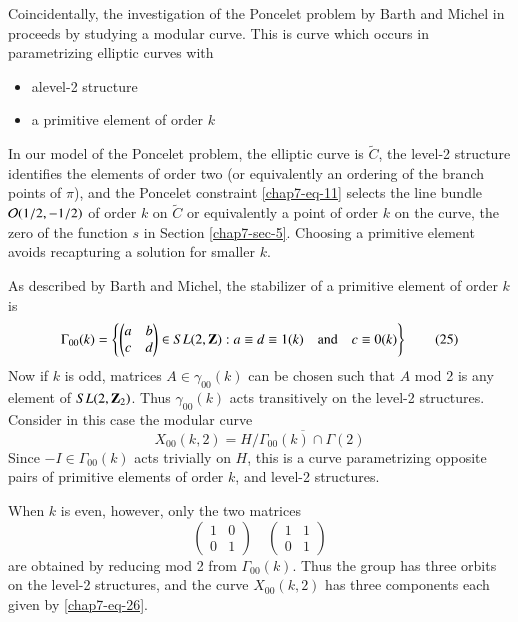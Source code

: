 Coincidentally, the investigation of the Poncelet problem by Barth and Michel in \cite{chap7-key1} proceeds by studying a modular curve. This is curve which occurs in parametrizing elliptic curves with     
\begin{itemize}
\item a\pageoriginale level-2 structure

\item a primitive element of order $k$
\end{itemize}
In our model of the Poncelet problem, the elliptic curve is $\tilde{C}$, the level-2
structure identifies the elements of order two (or equivalently an ordering of the branch points of $\pi$), and the Poncelet constraint \eqref{chap7-eq-11} selects the line bundle $\mathcal{O}(1/2,-1/2)$ of order $k$ on $\tilde{C}$ or equivalently a point of order $k$ on the curve, the zero of the function $s$ in Section \ref{chap7-sec-5}. Choosing a primitive element avoids recapturing a solution for smaller $k$.

As described by Barth and Michel, the stabilizer of a primitive element of order $k$ is
\begin{equation*}\label{chap7-eq-25}
\Gamma_{00}(k) = \left\{\begin{pmatrix}
a & b\\
c & d
\end{pmatrix}
\in SL(2, \mathbf{Z}) : a \equiv d \equiv 1(k)\quad  \text{and}\quad c\equiv 0(k)\right\}\tag{25}
\end{equation*}
Now if $k$ is odd, matrices $A\in \gamma_{00}(k)$ can be chosen such that $A$ mod 2 is any element of $SL(2,\mathbf{Z}_{2})$. Thus $\gamma_{00}(k)$ acts transitively on the level-2 structures. Consider in this case the modular curve
\begin{equation*}\label{chap7-eq-26}
X_{00}(k,2) = \overline{H/\Gamma_{00}(k)\cap \Gamma(2)}\tag{26}
\end{equation*}
Since $-I \in \Gamma_{00}(k)$ acts trivially on $H$, this is a curve parametrizing opposite pairs of primitive elements of order $k$, and level-2 structures.

When $k$ is even, however, only the two matrices
$$
\begin{pmatrix}
 1 & 0\\
 0 & 1
\end{pmatrix}
\quad 
\begin{pmatrix}
 1 & 1\\
 0 & 1
\end{pmatrix}
$$
are obtained by reducing mod 2 from $\Gamma_{00}(k)$. Thus the group has three orbits on the level-2 structures, and the curve $X_{00}(k,2)$ has three components each given by \eqref{chap7-eq-26}.

